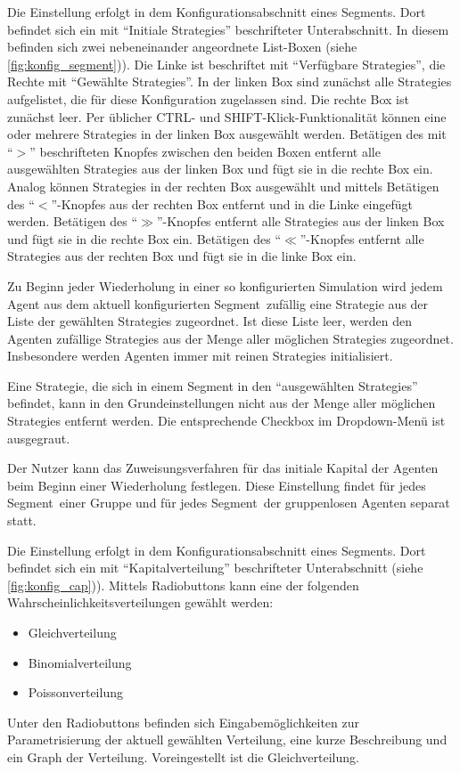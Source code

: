 \documentclass[parskip=full,11pt]{scrartcl}
\def\segment{Segment}
\begin{document}
Die Einstellung erfolgt in dem Konfigurationsabschnitt eines \segment s. Dort befindet sich ein mit \enquote{Initiale \Glspl{Strategie}} beschrifteter Unterabschnitt. In diesem befinden sich zwei nebeneinander angeordnete List-Boxen (siehe \cref{fig:konfig_segment})). Die Linke ist beschriftet mit \enquote{Verfügbare \Glspl{Strategie}}, die Rechte mit \enquote{Gewählte \Glspl{Strategie}}. In der linken Box sind zunächst alle \Glspl{Strategie} aufgelistet, die für diese Konfiguration zugelassen sind. Die rechte Box ist zunächst leer. Per üblicher \textsf{CTRL}- und \textsf{SHIFT}-Klick-Funktionalität können eine oder mehrere \Glspl{Strategie} in der linken Box ausgewählt werden. Betätigen des mit \enquote{\(>\)} beschrifteten Knopfes zwischen den beiden Boxen entfernt alle ausgewählten \Glspl{Strategie} aus der linken Box und fügt sie in die rechte Box ein. Analog können \Glspl{Strategie} in der rechten Box ausgewählt und mittels Betätigen des \enquote{\(<\)}-Knopfes aus der rechten Box entfernt und in die Linke eingefügt werden. Betätigen des \enquote{\(\gg\)}-Knopfes entfernt alle \Glspl{Strategie} aus der linken Box und fügt sie in die rechte Box ein. Betätigen des \enquote{\(\ll\)}-Knopfes entfernt alle \Glspl{Strategie} aus der rechten Box und fügt sie in die linke Box ein.

Zu Beginn jeder Wiederholung in einer so konfigurierten Simulation wird jedem Agent aus dem aktuell konfigurierten \segment\ zufällig eine \Gls{Strategie} aus der Liste der gewählten \Glspl{Strategie} zugeordnet. Ist diese Liste leer, werden den Agenten zufällige \Glspl{Strategie} aus der Menge aller möglichen \Glspl{Strategie} zugeordnet. Insbesondere werden Agenten immer mit reinen \Glspl{Strategie} initialisiert.

Eine \Gls{Strategie}, die sich in einem Segment in den \enquote{ausgewählten \Glspl{Strategie}} befindet, kann in den Grundeinstellungen nicht aus der Menge aller möglichen \Glspl{Strategie} entfernt werden. Die entsprechende Checkbox im Dropdown-Menü ist ausgegraut.

Der \Gls{Nutzer} kann das Zuweisungsverfahren für das initiale Kapital der Agenten beim Beginn einer Wiederholung festlegen. Diese Einstellung findet für jedes \segment\ einer Gruppe und für jedes \segment\ der gruppenlosen Agenten separat statt.

Die Einstellung erfolgt in dem Konfigurationsabschnitt eines \segment s. Dort befindet sich ein mit \enquote{Kapitalverteilung} beschrifteter Unterabschnitt (siehe \cref{fig:konfig_cap})). Mittels Radiobuttons kann eine der folgenden Wahrscheinlichkeitsverteilungen gewählt werden:
\begin{itemize}\itemsep -10pt
\item Gleichverteilung
\item Binomialverteilung
\item Poissonverteilung
\end{itemize}
Unter den Radiobuttons befinden sich Eingabemöglichkeiten zur Parametrisierung der aktuell gewählten Verteilung, eine kurze Beschreibung und ein Graph der Verteilung. Voreingestellt ist die Gleichverteilung.
\end{document}
